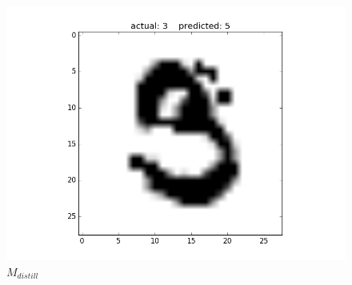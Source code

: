 \documentclass{article}
\begin{document}
\begin{figure}[h!]
\begin{minipage}{0.3\textwidth}
		\includegraphics[width=\textwidth]{distill1.png}
		\caption{$M_{distill}$}
	\end{minipage} \hfill
\end{figure}
\end{document}
